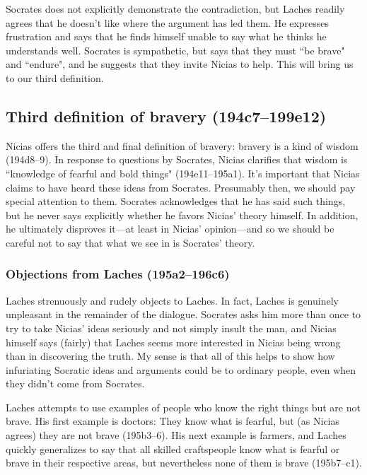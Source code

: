 \documentclass[11pt]{article}
\begin{document}
Socrates does not explicitly demonstrate the contradiction, but Laches readily
agrees that he doesn't like where the argument has led them.  He expresses
frustration and says that he finds himself unable to say what he thinks he
understands well.  Socrates is sympathetic, but says that they must ``be brave"
and ``endure", and he suggests that they invite Nicias to help.  This will
bring us to our third definition.


\subsection{Third definition of bravery (194c7--199e12)}

Nicias offers the third and final definition of bravery: bravery is a kind of
wisdom (194d8--9).  In response to questions by Socrates, Nicias clarifies that
wisdom is ``knowledge of fearful and bold things" (194e11--195a1).  It's
important that Nicias claims to have heard these ideas from Socrates.
Presumably then, we should pay special attention to them.  Socrates
acknowledges that he has said such things, but he never says explicitly whether
he favors Nicias' theory himself.  In addition, he ultimately disproves it---at
least in Nicias' opinion---and so we should be careful not to say that what we
see in  is Socrates' theory.


\subsubsection{Objections from Laches (195a2--196c6)}

Laches strenuously and rudely objects to Laches.  In fact, Laches is genuinely
unpleasant in the remainder of the dialogue.  Socrates asks him more than once
to try to take Nicias' ideas seriously and not simply insult the man, and
Nicias himself says (fairly) that Laches seems more interested in Nicias being
wrong than in discovering the truth.  My sense is that all of this helps to
show how infuriating Socratic ideas and arguments could be to ordinary people,
even when they didn't come from Socrates.

Laches attempts to use examples of people who know the right things but are not
brave.  His first example is doctors: They know what is fearful, but (as Nicias
agrees) they are not brave (195b3--6).  His next example is farmers, and Laches
quickly generalizes to say that all skilled craftspeople know what is fearful
or brave in their respective areas, but nevertheless none of them is brave
(195b7--c1).
\end{document}
